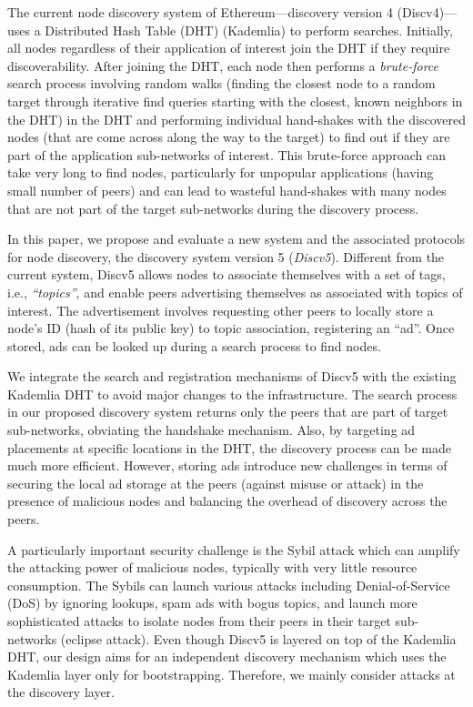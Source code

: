 The current node discovery system of Ethereum---\ie discovery version 4 (Discv4)---uses a Distributed Hash Table (DHT) (Kademlia) to perform searches. Initially, all nodes regardless of their application of interest join the DHT if they require discoverability. After joining the DHT, each node then performs a \textit{brute-force} search process involving random walks (\ie finding the closest node to a random target through iterative find queries starting with the closest, known neighbors in the DHT) in the DHT and performing individual hand-shakes with the discovered nodes (that are come across along the way to the target) to find out if they are part of the application sub-networks of interest. This brute-force approach can take very long to find nodes, particularly for unpopular applications (\ie having small number of peers) and can lead to wasteful hand-shakes with many nodes that are not part of the target sub-networks during the discovery process. 

In this paper, we propose and evaluate a new system and the associated protocols for node discovery, \ie the discovery system version 5 (\textit{Discv5}). Different from the current system, Discv5 allows nodes to associate themselves with a set of tags, i.e., \textit{``topics''}, and enable peers advertising themselves as associated with topics of interest. The advertisement involves requesting other peers to locally store a node's ID (hash of its public key) to topic association, \ie  registering an ``ad''. Once stored, ads can be looked up during a search process to find nodes. 

We integrate the search and registration mechanisms of Discv5 with the existing Kademlia DHT to avoid major changes to the infrastructure. The search process in our proposed discovery system returns only the peers that are part of target sub-networks, obviating the handshake mechanism. Also, by targeting ad placements at specific locations in the DHT, the discovery process can be made much more efficient. However, storing ads introduce new challenges in terms of securing the local ad storage at the peers (\ie against misuse or attack) in the presence of malicious nodes and balancing the overhead of discovery across the peers. 

A particularly important security challenge is the Sybil attack which can amplify the attacking power of malicious nodes, typically with very little resource consumption. The Sybils can launch various attacks including Denial-of-Service (DoS) by ignoring lookups, spam ads with bogus topics, and launch more sophisticated attacks to isolate nodes from their peers in their target sub-networks (\ie eclipse attack). Even though Discv5 is layered on top of the Kademlia DHT, our design aims for an independent discovery mechanism which uses the Kademlia layer only for bootstrapping. Therefore, we mainly consider attacks at the discovery layer.


